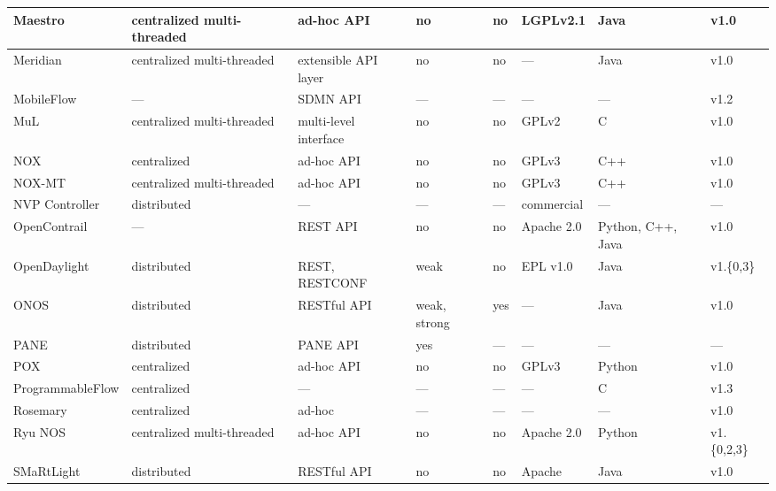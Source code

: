 {\begin{table}[!htp]
\begin{center}
\begin{tabularx}{\linewidth}{p{2.94cm}Xp{2.29cm}p{1.47cm}p{0.75cm}p{1.35cm}p{2.1cm}p{0.9cm}}
\hline
Maestro~\cite{cai2011}    & centralized multi-threaded  & ad-hoc API & no & no & LGPLv2.1 & Java & v1.0 \\
\hline
Meridian~\cite{banikazemi2013} & centralized multi-threaded & extensible API layer & no & no & --- & Java & v1.0\\
\hline
MobileFlow~\cite{pentikousis2013} & --- & SDMN API & --- & --- & --- & --- & v1.2 \\
\hline
MuL~\cite{Saikia:2013:MuL}        & centralized multi-threaded  & multi-level interface & no & no & GPLv2 & C & v1.0 \\
\hline
NOX~\cite{gude2008}       & centralized               & ad-hoc API  & no & no & GPLv3 & C++ & v1.0 \\
\hline
NOX-MT~\cite{tootoonchian2012}     & centralized multi-threaded  & ad-hoc API & no & no & GPLv3 & C++ & v1.0 \\
\hline
NVP Controller~\cite{koponen} & distributed & --- & --- & --- & commercial & --- & --- \\
\hline
OpenContrail~\cite{junipernetworks2013-1} & --- & REST API & no & no & Apache 2.0 & Python, C++, Java & v1.0\\
\hline
OpenDaylight~\cite{opendaylight2013} & distributed & REST, RESTCONF & weak & no & EPL v1.0 & Java & v1.\{0,3\} \\
\hline
ONOS~\cite{krishnaswamy2013} & distributed & RESTful API & weak, strong & yes & --- & Java & v1.0 \\
\hline

PANE~\cite{ferguson2013} & {distributed} & {PANE API} & {yes} & {---} & {---} & {---} & {---} \\
\hline

POX~\cite{mccauley2012}       & centralized               & ad-hoc API  & no & no & GPLv3 & Python & v1.0 \\\hline
ProgrammableFlow \cite{shimonishi2010} & centralized & --- & --- & --- & --- & C & v1.3 \\
\hline

{Rosemary~\cite{shin2014}} & {centralized} & {ad-hoc} & {---} & {---} & {---} & {---} & {v1.0} \\
\hline

Ryu NOS~\cite{nippontelegraphandtelephonecorporation2012} & centralized multi-threaded & ad-hoc API & no & no & Apache 2.0 & Python & v1.\{0,2,3\}\\
\hline

{SMaRtLight~\cite{Botelho2014}} & {distributed} & {RESTful API} & {no} & {no} & {Apache} & {Java} & {v1.0} \\
\hline


\end{tabularx}
\end{center}
\end{table}}

